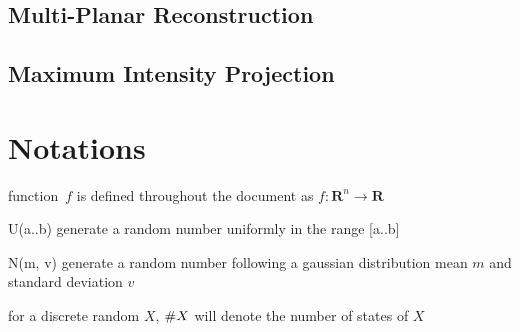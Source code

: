 \documentclass[11pt]{article}
\newcommand{\counta}[1]{\small{\#}#1}
\begin{document}
\subsection{Multi-Planar Reconstruction}
\subsection{Maximum Intensity Projection}

\section{Notations}
\begin{compactitem}
\item function~$f$ is defined throughout the document as $f \colon \textbf{R}^n \to \textbf{R}$
\item U(a..b) generate a random number uniformly in the range [a..b]
\item N(m, v) generate a random number following a gaussian distribution mean $m$ and standard deviation $v$
\item for a discrete random $X$, $\counta{X}$ will denote the number of states of $X$
\end{compactitem}



\end{document}
